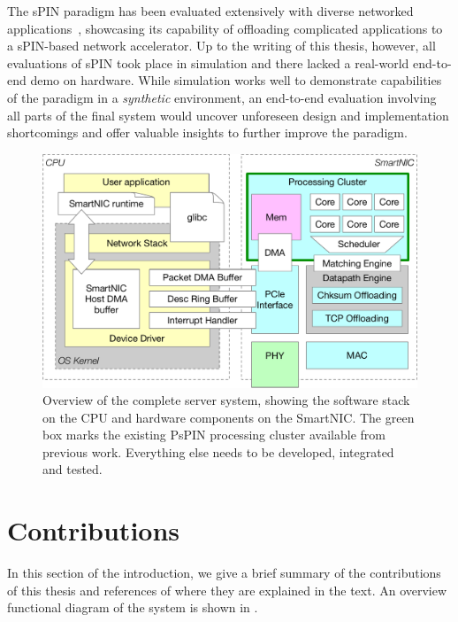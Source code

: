 The sPIN paradigm has been evaluated extensively with diverse networked applications~\cite{di_girolamo_network-accelerated_2019, cao_accelerating_2022, di_girolamo_building_2022}, showcasing its capability of offloading complicated applications to a sPIN-based network accelerator.  Up to the writing of this thesis, however, all evaluations of sPIN took place in simulation and there lacked a real-world end-to-end demo on hardware.  While simulation works well to demonstrate capabilities of the paradigm in a \emph{synthetic} environment, an end-to-end evaluation involving all parts of the final system would uncover unforeseen design and implementation shortcomings and offer valuable insights to further improve the paradigm.

\begin{figure}
    \centering
    \includegraphics[width=.9\linewidth]{figures/system-overview.pdf}
    \caption{Overview of the complete server system, showing the software stack on the CPU and hardware components on the SmartNIC.  The green box marks the existing PsPIN processing cluster available from previous work.  Everything else needs to be developed, integrated and tested.}
    \label{fig:full-system}
\end{figure}

\section{Contributions} \label{sec:contributions}

In this section of the introduction, we give a brief summary of the contributions of this thesis and references of where they are explained in the text.  An overview functional diagram of the system is shown in .

